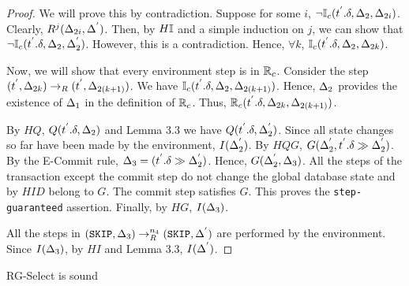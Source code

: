 \documentclass[acmlarge,anonymous]{acmart}\settopmatter{printfolios=true}
\begin{document}
\begin{proof}
We will prove this by contradiction. Suppose for some $i$, $\neg \mathbb{I}_c(t^{'}.\delta, \Delta_2, \Delta_{2i})$. Clearly, $R^{j}(\Delta_{2i}, \Delta^{'})$. Then, by $H\mathbb{I}$ and a simple induction on $j$, we can show that $\neg \mathbb{I}_c(t^{'}.\delta, \Delta_2, \Delta_{2}^{'})$. However, this is a contradiction. Hence, $\forall k$, $\mathbb{I}_c(t^{'}.\delta, \Delta_2, \Delta_{2k})$.

Now, we will show that every environment step is in $\mathbb{R}_c$. Consider the step $(t^{'}, \Delta_{2k}) \rightarrow_R (t^{'}, \Delta_{2(k+1)})$. We have $\mathbb{I}_c(t^{'}.\delta, \Delta_2, \Delta_{2(k+1)})$. Hence, $\Delta_2$ provides the existence of $\Delta_1$ in the definition of $\mathbb{R}_c$. Thus, $\mathbb{R}_c(t^{'}.\delta, \Delta_{2k}, \Delta_{2(k+1)})$.

By $HQ$, $Q(t^{'}.\delta, \Delta_2)$ and Lemma 3.3 we have $Q(t^{'}.\delta, \Delta_{2}^{'})$. Since all state changes so far have been made by the environment, $I(\Delta_{2}^{'})$. By $HQG$, $G(\Delta_{2}^{'}, t^{'}.\delta \gg \Delta_{2}^{'})$. By the E-Commit rule, $\Delta_3 = (t^{'}.\delta \gg \Delta_{2}^{'})$. Hence, $G(\Delta_{2}^{'}, \Delta_3)$. All the steps of the transaction except the commit step do not change the global database state and by $HID$ belong to $G$. The commit step satisfies $G$. This proves the \texttt{step-guaranteed} assertion. Finally, by $HG$, $I(\Delta_3)$.


All the steps in $(\texttt{SKIP}, \Delta_3) \rightarrow_{R}^{n_4} (\texttt{SKIP}, \Delta^{'})$ are performed by the environment. Since $I(\Delta_3)$, by $HI$ and Lemma 3.3, $I(\Delta^{'})$.
\end{proof}


\begin{theorem}
RG-Select is sound
\end{theorem}
\end{document}
